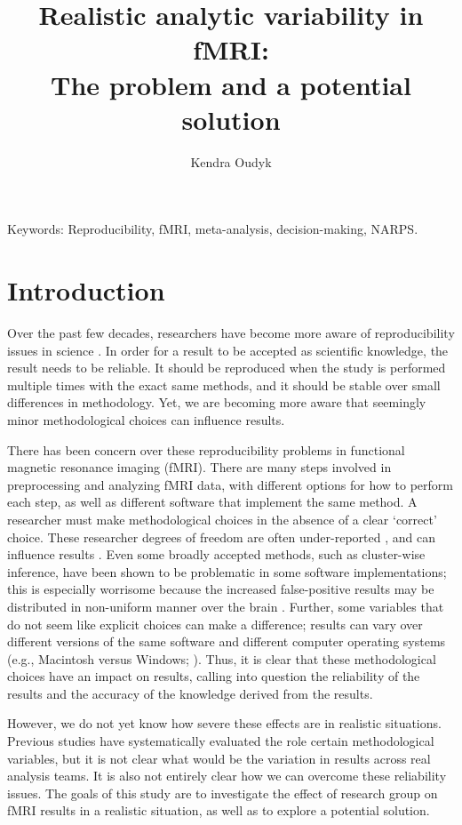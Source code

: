 \documentclass[a4paper,doc,natbib]{apa6}
\title{Realistic analytic variability in fMRI:\\The problem and a potential solution}
\author{Kendra Oudyk}
\affiliation{\\ Final project for NEUR608 Neuroimaging Data Science \\ Drs. Boris Bernhardt and Bratislav Misic, Instructors \\ McGill University \\ 2019-12-10}
\begin{document}
\maketitle

Keywords: Reproducibility, fMRI, meta-analysis, decision-making, NARPS.

\vspace{1cm}

\section{Introduction}
Over the past few decades, researchers have become more aware of reproducibility issues in science \citep{ioannidis2005most}. In order for a result to be accepted as scientific knowledge, the result needs to be reliable. It should be reproduced when the study is performed multiple times with the exact same methods, and it should be stable over small differences in methodology. Yet, we are becoming more aware that seemingly minor methodological choices can influence results. 

There has been concern over these reproducibility problems in functional magnetic resonance imaging (fMRI). There are many steps involved in preprocessing and analyzing fMRI data, with different options for how to perform each step, as well as different software that implement the same method. A researcher must make methodological choices in the absence of a clear `correct' choice. These researcher degrees of freedom are often under-reported \citep{carp_secret_2012}, and can influence results \citep{poldrack2017scanning, carp_plurality_2012}. Even some broadly accepted methods, such as cluster-wise inference, have been shown to be problematic in some software implementations; this is especially worrisome because the increased false-positive results may be distributed in non-uniform manner over the brain \citep{eklund_cluster_2016}. Further, some variables that do not seem like explicit choices can make a difference; results can vary over different versions of the same software \citealp{gronenschild_effects_2012} and different computer operating systems (e.g., Macintosh versus Windows; \citealp{glatard_reproducibility_2015}). Thus, it is clear that these methodological choices have an impact on results, calling into question the reliability of the results and the accuracy of the knowledge derived from the results. 

However, we do not yet know how severe these effects are in realistic situations. Previous studies have systematically evaluated the role certain methodological variables, but it is not clear what would be the variation in results across real analysis teams. It is also not entirely clear how we can overcome these reliability issues. The goals of this study are to investigate the effect of research group on fMRI results in a realistic situation, as well as to explore a potential solution.
\end{document}
